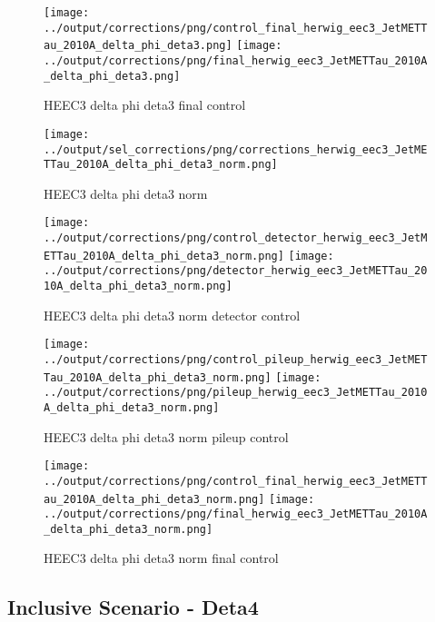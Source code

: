 \documentclass[11pt]{book}
\begin{document}
\begin{figure}[ht]
\centering
\texttt{[image: ../output/corrections/png/control\_final\_herwig\_eec3\_JetMETTau\_2010A\_delta\_phi\_deta3.png]}
\texttt{[image: ../output/corrections/png/final\_herwig\_eec3\_JetMETTau\_2010A\_delta\_phi\_deta3.png]}
\caption{HEEC3 delta phi deta3 final control}
\label{fig:HEEC3_JetMETTau_2010A_delta_phi_deta3_final_control}
\end{figure}


\begin{figure}[ht]
\centering
\texttt{[image: ../output/sel\_corrections/png/corrections\_herwig\_eec3\_JetMETTau\_2010A\_delta\_phi\_deta3\_norm.png]}
\caption{HEEC3 delta phi deta3 norm}
\label{fig:HEEC3_JetMETTau_2010A_delta_phi_deta3_norm}
\end{figure}

\begin{figure}[ht]
\centering
\texttt{[image: ../output/corrections/png/control\_detector\_herwig\_eec3\_JetMETTau\_2010A\_delta\_phi\_deta3\_norm.png]}
\texttt{[image: ../output/corrections/png/detector\_herwig\_eec3\_JetMETTau\_2010A\_delta\_phi\_deta3\_norm.png]}
\caption{HEEC3 delta phi deta3 norm detector control}
\label{fig:HEEC3_JetMETTau_2010A_delta_phi_deta3_norm_detector_control}
\end{figure}

\begin{figure}[ht]
\centering
\texttt{[image: ../output/corrections/png/control\_pileup\_herwig\_eec3\_JetMETTau\_2010A\_delta\_phi\_deta3\_norm.png]}
\texttt{[image: ../output/corrections/png/pileup\_herwig\_eec3\_JetMETTau\_2010A\_delta\_phi\_deta3\_norm.png]}
\caption{HEEC3 delta phi deta3 norm pileup control}
\label{fig:HEEC3_JetMETTau_2010A_delta_phi_deta3_norm_pileup_control}
\end{figure}


\begin{figure}[ht]
\centering
\texttt{[image: ../output/corrections/png/control\_final\_herwig\_eec3\_JetMETTau\_2010A\_delta\_phi\_deta3\_norm.png]}
\texttt{[image: ../output/corrections/png/final\_herwig\_eec3\_JetMETTau\_2010A\_delta\_phi\_deta3\_norm.png]}
\caption{HEEC3 delta phi deta3 norm final control}
\label{fig:HEEC3_JetMETTau_2010A_delta_phi_deta3_norm_final_control}
\end{figure}


\clearpage
\subsection{Inclusive Scenario - Deta4}
\end{document}
